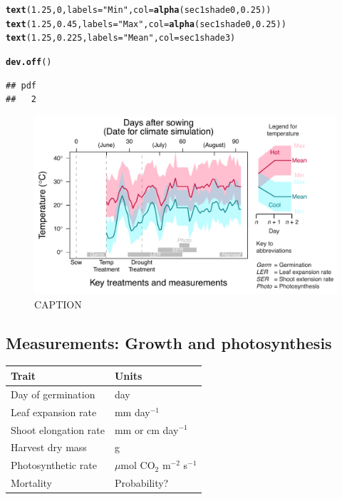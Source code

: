 \documentclass[11pt, oneside]{article}\usepackage[]{graphicx}\usepackage[]{color}
\makeatletter
\newcommand{\hlnum}[1]{\textcolor[rgb]{0.686,0.059,0.569}{#1}}%
\newcommand{\hlstr}[1]{\textcolor[rgb]{0.192,0.494,0.8}{#1}}%
\newcommand{\hlstd}[1]{\textcolor[rgb]{0.345,0.345,0.345}{#1}}%
\newcommand{\hlkwc}[1]{\textcolor[rgb]{0.333,0.667,0.333}{#1}}%
\newcommand{\hlkwd}[1]{\textcolor[rgb]{0.737,0.353,0.396}{\textbf{#1}}}%
\newenvironment{kframe}{%
 \def\at@end@of@kframe{}%
 \ifinner\ifhmode%
  \def\at@end@of@kframe{\end{minipage}}%
  \begin{minipage}{\columnwidth}%
 \fi\fi%
 \def\FrameCommand##1{\hskip\@totalleftmargin \hskip-\fboxsep
 \colorbox{shadecolor}{##1}\hskip-\fboxsep
     \hskip-\linewidth \hskip-\@totalleftmargin \hskip\columnwidth}%
 \MakeFramed {\advance\hsize-\width
   \@totalleftmargin\z@ \linewidth\hsize
   \@setminipage}}%
 {\par\unskip\endMakeFramed%
 \at@end@of@kframe}
\newenvironment{knitrout}{}{} %
\makeatother
\begin{document}
\begin{knitrout}
\begin{kframe}
\begin{alltt}
\hlkwd{text}\hlstd{(}\hlnum{1.25}\hlstd{,} \hlnum{0}\hlstd{,} \hlkwc{labels} \hlstd{=} \hlstr{"Min"}\hlstd{,} \hlkwc{col} \hlstd{=} \hlkwd{alpha}\hlstd{(sec1shade0,} \hlnum{0.25}\hlstd{))}
\hlkwd{text}\hlstd{(}\hlnum{1.25}\hlstd{,} \hlnum{0.45}\hlstd{,} \hlkwc{labels} \hlstd{=} \hlstr{"Max"}\hlstd{,} \hlkwc{col} \hlstd{=} \hlkwd{alpha}\hlstd{(sec1shade0,} \hlnum{0.25}\hlstd{))}
\hlkwd{text}\hlstd{(}\hlnum{1.25}\hlstd{,} \hlnum{0.225}\hlstd{,} \hlkwc{labels} \hlstd{=} \hlstr{"Mean"}\hlstd{,} \hlkwc{col} \hlstd{= sec1shade3)}

\hlkwd{dev.off}\hlstd{()}
\end{alltt}
\begin{verbatim}
## pdf 
##   2
\end{verbatim}
\end{kframe}
\end{knitrout}

\begin{figure}[h!]
	\centerline{\includegraphics[width=1\textwidth]{Figures/Figure_ExptlDes.pdf}}
	\fontsize{10}{12}
	\selectfont
	\caption[Experimental Design]{CAPTION}
	\label{fig:Fig_ExptlDes}
\end{figure}

\subsection*{Measurements: Growth and photosynthesis}

\begin{table}[ht]
   \centering
   \begin{tabular}{@{} ll @{}}
      \toprule
  Trait & Units \\
      \midrule
  Day of germination  & day \\
  Leaf expansion rate  &  mm day$^{-1}$  \\
  Shoot elongation rate  &  mm or cm day$^{-1}$  \\
  Harvest dry mass &  g  \\
  Photosynthetic rate &  $\mu$mol CO$_2$ m$^{-2}$ s$^{-1}$\\
  Mortality &  Probability?  \\
	    \bottomrule
   \end{tabular}
\end{table}
\end{document}
